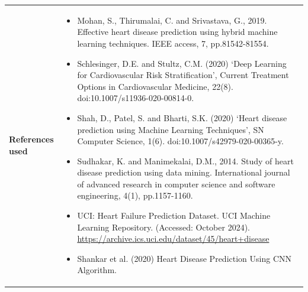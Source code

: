 \begin{longtable}{|p{4cm}|p{11cm}|}
\textbf{References used} & 
\begin{itemize}
    \item Mohan, S., Thirumalai, C. and Srivastava, G., 2019. Effective heart disease prediction using hybrid machine learning techniques. IEEE access, 7, pp.81542-81554. 
    \item Schlesinger, D.E. and Stultz, C.M. (2020) ‘Deep Learning for Cardiovascular Risk Stratification’, Current Treatment Options in Cardiovascular Medicine, 22(8). doi:10.1007/s11936-020-00814-0.
 \item Shah, D., Patel, S. and Bharti, S.K. (2020) ‘Heart disease prediction using Machine Learning Techniques’, SN Computer Science, 1(6). doi:10.1007/s42979-020-00365-y.
\item Sudhakar, K. and Manimekalai, D.M., 2014. Study of heart disease prediction using data mining. International journal of advanced research in computer science and software engineering, 4(1), pp.1157-1160.
    \item UCI: Heart Failure Prediction Dataset. UCI Machine Learning Repository. (Accessed: October 2024). \url{https://archive.ics.uci.edu/dataset/45/heart+disease}
    
    \item Shankar et al. (2020) Heart Disease Prediction Using CNN Algorithm.
\end{itemize}


\end{longtable}
